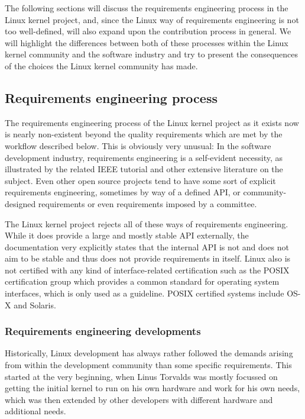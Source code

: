 \documentclass{sig-alternate-05-2015}
\begin{document}
The following sections will discuss the requirements engineering process in the Linux kernel project, and, since the Linux way of requirements engineering is not too well-defined, will also expand upon the contribution process in general.
We will highlight the differences between both of these processes within the Linux kernel community and the software industry and try to present the consequences of the choices the Linux kernel community has made.

\subsection{Requirements engineering process}

The requirements engineering process of the Linux kernel project as it exists now is nearly non-existent beyond the quality requirements which are met by the workflow described below.
This is obviously very unusual: In the software development industry, requirements engineering is a self-evident necessity, as illustrated by the related IEEE tutorial\cite{thayer1997software} and other extensive literature on the subject.
Even other open source projects tend to have some sort of explicit requirements engineering, sometimes by way of a defined API, or community-designed requirements or even requirements imposed by a committee.

The Linux kernel project rejects all of these ways of requirements engineering.
While it does provide a large and mostly stable API externally, the documentation very explicitly states that the internal API is not and does not aim to be stable and thus does not provide requirements in itself.
Linux also is not certified with any kind of interface-related certification such as the POSIX certification group which provides a common standard for operating system interfaces, which is only used as a guideline. POSIX certified systems include OS-X and Solaris.

\subsubsection{Requirements engineering developments}

Historically, Linux development has always rather followed the demands arising from within the development community than some specific requirements.
This started at the very beginning, when Linus Torvalds was mostly focussed on getting the initial kernel to run on his own hardware and work for his own needs, which was then extended by other developers with different hardware and additional needs.
\end{document}
